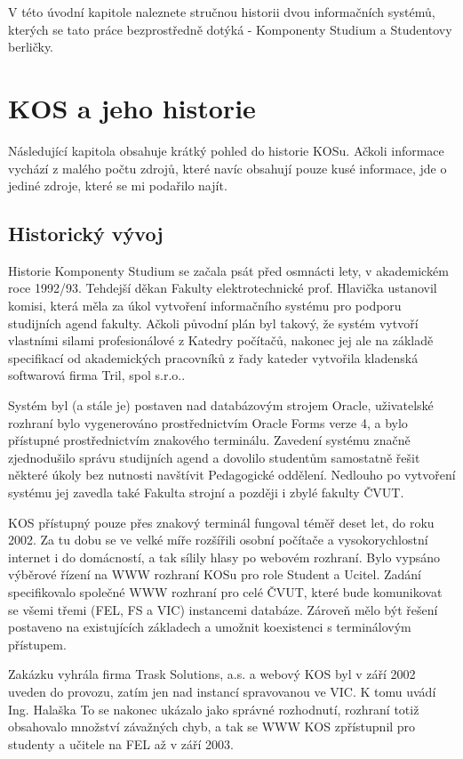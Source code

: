 \documentclass[11pt,twoside,a4paper]{book}
\begin{document}
V této úvodní kapitole naleznete stručnou historii dvou informačních systémů, kterých se tato práce bezprostředně dotýká - Komponenty Studium a Studentovy berličky.

\section{KOS a jeho historie}
Následující kapitola obsahuje krátký pohled do historie KOSu. Ačkoli informace vychází z malého počtu zdrojů, které navíc obsahují pouze kusé informace, jde o jediné zdroje, které se mi podařilo najít.
\subsection{Historický vývoj}
Historie Komponenty Studium se začala psát před osmnácti lety, v akademickém roce 1992/93\cite{forum:historie-kos}. Tehdejší děkan Fakulty elektrotechnické prof. Hlavička ustanovil komisi, která měla za úkol vytvoření informačního systému pro podporu studijních agend fakulty. Ačkoli původní plán byl takový, že systém vytvoří vlastními silami profesionálové z Katedry počítačů, nakonec jej ale na základě specifikací od akademických pracovníků z řady kateder vytvořila kladenská softwarová firma Tril, spol s.r.o.\cite{forum:neocekavana}.

Systém byl (a stále je) postaven nad databázovým strojem Oracle, uživatelské rozhraní bylo vygenerováno prostřednictvím Oracle Forms verze 4, a bylo přístupné prostřednictvím znakového terminálu. Zavedení systému značně zjednodušilo správu studijních agend a dovolilo studentům samostatně řešit některé úkoly bez nutnosti navštívit Pedagogické oddělení. Nedlouho po vytvoření systému jej zavedla také Fakulta strojní a později i zbylé fakulty ČVUT.

KOS přístupný pouze přes znakový terminál fungoval téměř deset let, do roku 2002. Za tu dobu se ve velké míře rozšířili osobní počítače a vysokorychlostní internet i do domácností, a tak sílily hlasy po webovém rozhraní. Bylo vypsáno výběrové řízení na WWW rozhraní KOSu pro role Student a Ucitel. Zadání specifikovalo společné WWW rozhraní pro celé ČVUT, které bude komunikovat se všemi třemi (FEL, FS a VIC) instancemi  databáze. Zároveň mělo být řešení postaveno na existujících základech a umožnit koexistenci s terminálovým přístupem. 

Zakázku vyhrála firma Trask Solutions, a.s. a webový KOS byl v září 2002 uveden do provozu, zatím jen nad instancí spravovanou ve VIC. K tomu uvádí Ing. Halaška\cite{student:komentar-ke-kos} \textit{} To se nakonec ukázalo jako správné rozhodnutí, rozhraní totiž obsahovalo množství závažných chyb, a tak se WWW KOS zpřístupnil pro studenty a učitele na FEL až v září 2003\cite{student:kos-na-web}.
\end{document}
